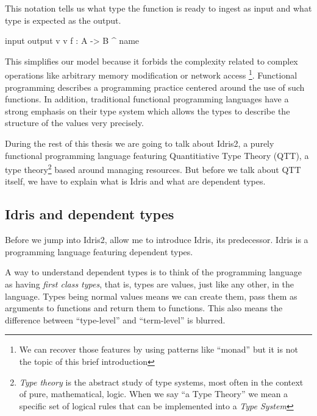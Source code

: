 \documentclass[
]{article}
\newenvironment{Shaded}{}{}
\newcommand{\DataTypeTok}[1]{\textcolor[rgb]{0.56,0.13,0.00}{#1}}
\newcommand{\NormalTok}[1]{#1}
\newcommand{\OperatorTok}[1]{\textcolor[rgb]{0.40,0.40,0.40}{#1}}
\newcommand{\OtherTok}[1]{\textcolor[rgb]{0.00,0.44,0.13}{#1}}
\begin{document}
This notation tells us what type the function is ready to ingest as
input and what type is expected as the output.

\begin{Shaded}
\begin{Highlighting}[]
\NormalTok{input    output}
\NormalTok{    v    v}
\NormalTok{f }\OperatorTok{:} \DataTypeTok{A} \OtherTok{{-}\textgreater{}} \DataTypeTok{B}
\OperatorTok{\^{}}
\NormalTok{name }
\end{Highlighting}
\end{Shaded}

This simplifies our model because it forbids the complexity related to
complex operations like arbitrary memory modification or network access
\footnote{We can recover those features by using patterns like ``monad''
  but it is not the topic of this brief introduction}. Functional
programming describes a programming practice centered around the use of
such functions. In addition, traditional functional programming
languages have a strong emphasis on their type system which allows the
types to describe the structure of the values very precisely.

During the rest of this thesis we are going to talk about Idris2, a
purely functional programming language featuring Quantitiative Type
Theory (QTT), a type theory\footnote{\emph{Type theory} is the abstract
  study of type systems, most often in the context of pure,
  mathematical, logic. When we say ``a Type Theory'' we mean a specific
  set of logical rules that can be implemented into a \emph{Type System}}
based around managing resources. But before we talk about QTT itself, we
have to explain what is Idris and what are dependent types.

\hypertarget{idris-and-dependent-types}{%
\subsection{Idris and dependent types}\label{idris-and-dependent-types}}

Before we jump into Idris2, allow me to introduce Idris\cite{idris1},
its predecessor. Idris is a programming language featuring dependent
types.

A way to understand dependent types is to think of the programming
language as having \emph{first class types}, that is, types are values,
just like any other, in the language. Types being normal values means we
can create them, pass them as arguments to functions and return them to
functions. This also means the difference between ``type-level'' and
``term-level'' is blurred.
\end{document}
